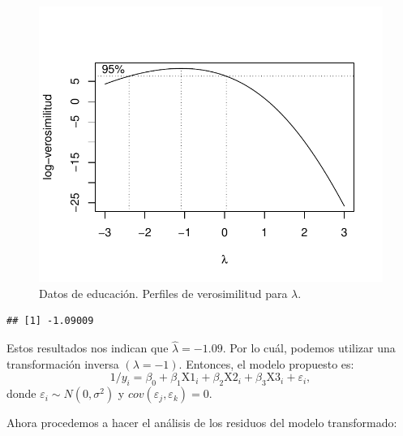 \documentclass[
]{article}
\newenvironment{Shaded}{\begin{snugshade}}{\end{snugshade}}
\newcommand{\CommentTok}[1]{\textcolor[rgb]{0.56,0.35,0.01}{\textit{#1}}}
\newcommand{\FunctionTok}[1]{\textcolor[rgb]{0.13,0.29,0.53}{\textbf{#1}}}
\newcommand{\NormalTok}[1]{#1}
\newcommand{\SpecialCharTok}[1]{\textcolor[rgb]{0.81,0.36,0.00}{\textbf{#1}}}
\begin{document}
\begin{figure}

{\centering \includegraphics{MLG1_files/figure-latex/educLambda-1} 

}

\caption{\label{fig:EducBC} Datos de educación. Perfiles de verosimilitud para $\lambda$.}\label{fig:educLambda}
\end{figure}

\begin{Shaded}
\end{Shaded}

\begin{verbatim}
## [1] -1.09009
\end{verbatim}

Estos resultados nos indican que \(\widehat{\lambda}= -1.09\). Por lo cuál, podemos utilizar una transformación inversa \((\lambda=-1)\). Entonces, el modelo propuesto es:
\[
1/y_{i} = \beta_{0} + \beta_{1}\mbox{X1}_{i}+ \beta_{2}\mbox{X2}_{i} + \beta_{3}\mbox{X3}_{i} + \varepsilon_{i},
\]
donde \(\varepsilon_{i}\sim N(0,\sigma^{2})\) y \(cov(\varepsilon_{j},\varepsilon_{k})=0\).

Ahora procedemos a hacer el análisis de los residuos del modelo transformado:
\end{document}
